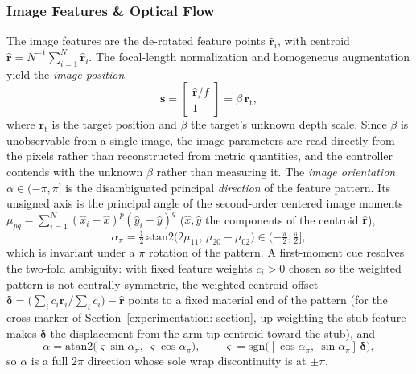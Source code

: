 \documentclass{IEEEtaes}
\theoremstyle{definition}
\theoremstyle{remark}
\begin{document}
\subsubsection{Image Features \& Optical Flow} \label{image features: section}
The image features are the de-rotated feature points $\hat{\boldsymbol{r}}_i$, with centroid $\hat{\boldsymbol{r}}=N^{-1}\sum_{i=1}^{N}\hat{\boldsymbol{r}}_i$. The focal-length normalization and homogeneous augmentation yield the \emph{image position}
\begin{equation} \label{image position: equation}
    \boldsymbol{s} = \begin{bmatrix}\hat{\boldsymbol{r}}/f\\ 1\end{bmatrix} = \beta\,\boldsymbol{r}_\text{t},
\end{equation}
where $\boldsymbol{r}_\text{t}$ is the target position and $\beta$ the target's unknown depth scale. Since $\beta$ is unobservable from a single image, the image parameters are read directly from the pixels rather than reconstructed from metric quantities, and the controller contends with the unknown $\beta$ rather than measuring it. The \emph{image orientation} $\alpha\in(-\pi,\pi]$ is the disambiguated principal \emph{direction} of the feature pattern. Its unsigned axis is the principal angle of the second-order centered image moments $\mu_{pq} = \sum_{i=1}^{N}(\hat{x}_i - \hat{x})^p(\hat{y}_i - \hat{y})^q$ ($\hat{x},\hat{y}$ the components of the centroid $\hat{\boldsymbol{r}}$),
\begin{equation} \label{image orientation principal axis: equation}
    \alpha_\pi = \tfrac12\,\mathrm{atan2}\big(2\mu_{11},\,\mu_{20}-\mu_{02}\big)\in(-\tfrac{\pi}{2},\tfrac{\pi}{2}],
\end{equation}
which is invariant under a $\pi$ rotation of the pattern. A first-moment cue resolves the two-fold ambiguity: with fixed feature weights $c_i>0$ chosen so the weighted pattern is not centrally symmetric, the weighted-centroid offset $\boldsymbol{\delta} = \big(\textstyle\sum_i c_i\hat{\boldsymbol{r}}_i\big/\sum_i c_i\big) - \hat{\boldsymbol{r}}$ points to a fixed material end of the pattern (for the cross marker of Section~\ref{experimentation: section}, up-weighting the stub feature makes $\boldsymbol{\delta}$ the displacement from the arm-tip centroid toward the stub), and
\begin{equation} \label{image orientation disambiguation: equation}
    \alpha = \mathrm{atan2}\big(\varsigma\sin\alpha_\pi,\ \varsigma\cos\alpha_\pi\big),\qquad
    \varsigma = \mathrm{sgn}\big([\cos\alpha_\pi,\ \sin\alpha_\pi]\,\boldsymbol{\delta}\big),
\end{equation}
so $\alpha$ is a full $2\pi$ direction whose sole wrap discontinuity is at $\pm\pi$.
\end{document}
